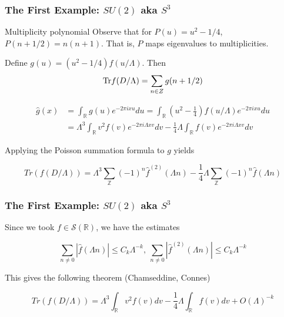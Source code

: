 \documentclass{beamer}
\def\Z{{\mathbb Z}}
\def\R{{\mathbb R}}
\def\cS{{\mathcal S}}
\def\Tr{{\rm Tr}}
\begin{document}
\begin{frame}
  \frametitle{The First Example: $SU(2)$ aka $S^3$}
  \begin{block}{Multiplicity polynomial}
  	Observe that for $P(u) = u^2 - 1/4$, $P(n + 1/2) = n(n+1)$. That is, $P$ maps eigenvalues to multiplicities.
  \end{block}
  
  \pause
  
  \begin{block}{}
    Define $g(u) = (u^2 -1/4)f(u/\Lambda)$. Then
    \[
    \Tr f(D/\Lambda) = \sum_{n \in Z} g(n+1/2)
    \]
  \end{block}

  \pause

  \begin{block}{}
    \begin{align*}
      \widehat{g}(x) &= \int_{\R}g(u) e^{-2 \pi i x u}du = \int_{\R}(u^2 - \frac{1}{4})f(u/\Lambda)e^{-2 \pi i x u}du \\
      &= \Lambda ^3 \int_{\R}v^2 f(v) e^{-2\pi i \Lambda x v}dv - \frac{1}{4} \Lambda \int_{\R}f(v)e^{-2\pi i \Lambda xv}dv
    \end{align*}
  \end{block}
\end{frame}

\begin{frame}
  \begin{block}{}
    Applying the Poisson summation formula to $g$ yields

    \[
      Tr(f(D/\Lambda)) = \Lambda^3 \sum_{\Z}(-1)^n \widehat{f}^{(2)}(\Lambda n) - \frac{1}{4} \Lambda \sum_{\Z}(-1)^n \widehat{f}(\Lambda n)
    \]
  \end{block}
\end{frame}

\begin{frame}
  \frametitle{The First Example: $SU(2)$ aka $S^3$}
  \begin{block}{}
    Since we took $f \in \cS (\R)$, we have the estimates

    \[
      \sum_{n \neq 0}|\widehat{f}(\Lambda n)| \leq C_k \Lambda^{-k}, ~ \sum_{n \neq 0}|\widehat{f}^{(2)}(\Lambda n)| \leq C_k \Lambda^{-k}
    \]
  \end{block}

  \pause

  \begin{block}{}
    This gives the following theorem (Chamseddine, Connes)

    \[
      Tr(f(D/\Lambda)) = \Lambda^3 \int_\R v^2 f(v) dv - \frac{1}{4}\Lambda \int_{\R}f(v)dv + O(\Lambda)^{-k}
    \]
  \end{block}
\end{frame}
\end{document}
